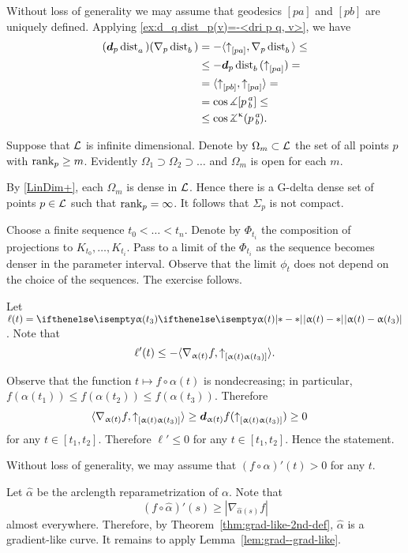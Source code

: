 Without loss of generality we may assume that geodesics $[pa]$ and $[pb]$ are uniquely defined.
Applying \ref{ex:d_q dist_p(v)=-<dri p q, v>}, we have
\begin{align*}(\dd_p\distfun{a}{}{})(\nabla_p\distfun{b}{}{})&=-\langle\dir pa,\nabla_p\distfun{b}{}{} \rangle\le
\\
&\le -\dd_p\distfun{b}{}{}(\dir pa)=
\\
&=\langle\dir pb, \dir pa\rangle=
\\
&= \cos\mangle\hinge p a b \le 
\\
&\le \cos\angk\kappa p a b.
\end{align*}


Suppose that $\mathcal{L}$ is infinite dimensional.
Denote by $\Omega_m\subset \spc{L}$ the set of all points $p$ with $\rank_p\ge m$.
Evidently $\Omega_1\supset \Omega_2\supset\dots$ and $\Omega_m$ is open for each $m$.

By \ref{LinDim+}, each $\Omega_m$ is dense in $\mathcal{L}$.
Hence there is a G-delta dense set of points $p\in\spc{L}$ such that $\mathop{\rm rank}\nolimits_p=\infty$.
It follows that $\Sigma_p$ is not compact.

Choose a finite sequence $t_0<\dots<t_n$.
Denote by $\Phi_{t_i}$ the composition of projections to $K_{t_0},\dots, K_{t_i}$.
Pass to a limit of the $\Phi_{t_i}$ as the sequence becomes denser in the parameter interval. Observe that the limit $\phi_t$ does not depend on the choice of the sequences. The exercise follows. 


Let $\ell(t)=\dist{\alpha(t)}{\alpha(t_3)}{}$.
Note that 
\[\ell'(t)\le -\langle \nabla_{\alpha(t)}f,\dir{\alpha(t)}{\alpha(t_3)}\rangle.\]

Observe that the function $t\mapsto f\circ\alpha(t)$ is nondecreasing;
in particular, $f(\alpha(t_1))\le f(\alpha(t_2))\le f(\alpha(t_3))$.
Therefore 
\begin{align*}\langle \nabla_{\alpha(t)}f,\dir{\alpha(t)}{\alpha(t_3)}\rangle&\ge\dd_{\alpha(t)}f(\dir{\alpha(t)}{\alpha(t_3)})\ge 0
\end{align*}
for any $t\in[t_1,t_2]$.
Therefore $\ell'\le 0$ for any $t\in[t_1,t_2]$. Hence the statement.

Without loss of generality, we may assume that $(f\circ\alpha)'(t)>0$ for any $t$.

Let $\hat\alpha$ be the arclength reparametrization of $\alpha$.
Note that 
\[(f\circ\hat\alpha)'(s)\ge |\nabla_{\hat\alpha(s)}f|\]
almost everywhere.
Therefore, by Theorem~\ref{thm:grad-like-2nd-def}, $\hat\alpha$ is a gradient-like curve.
It remains to apply Lemma~\ref{lem:grad--grad-like}.

